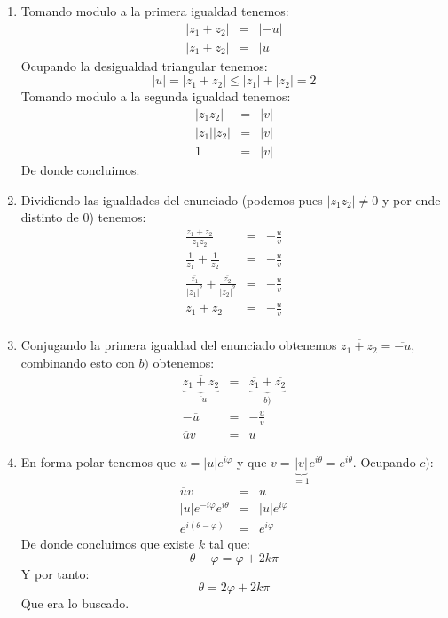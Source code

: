 \documentclass[letterpaper,11pt]{article}
\theoremstyle{plain}
\begin{document}
\begin{framed}
\begin{enumerate}[\it a)]
		\item Tomando modulo a la primera igualdad tenemos:
\begin{eqnarray*}
|z_1+z_2| & = & |-u| \\
|z_1+z_2| & = & |u|	
\end{eqnarray*}	
Ocupando la desigualdad triangular tenemos:
$$
|u|=|z_1+z_2| \leq |z_1|+|z_2| = 2 
$$
Tomando modulo a la segunda igualdad tenemos:
\begin{eqnarray*}
	|z_1z_2| & = & |v| \\
	|z_1||z_2|  & = & |v| \\
	1 & = & |v|
\end{eqnarray*}
De donde concluimos.
	\item Dividiendo las igualdades del enunciado (podemos pues $|z_1z_2| \neq 0 $ y por ende distinto de 0) tenemos:
	\begin{eqnarray*}
	 \frac{z_1+z_2}{z_1z_2} & = & -\frac{u}{v} \\
  \frac{1}{z_1}+ \frac{1}{z_2} & = & -\frac{u}{v} \\ 
  \frac{\overline{z_1}}{|z_1|^2} +   \frac{\overline{z_2}}{|z_2|^2}  & = & -\frac{u}{v} \\
\overline{z_1}+\overline{z_2} & = &  -\frac{u}{v}\\
	\end{eqnarray*}
	
		\item Conjugando la primera igualdad del enunciado obtenemos $\overline{z_1+z_2 }= \overline{-u}$, combinando esto con $b)$ obtenemos:
		\begin{eqnarray*}
		\underbrace{\overline{z_1+z_2 }}_{\overline{-u}}	& = & \underbrace{\overline{z_1}+ \overline{z_2}}_{b)} \\
		-\overline{u }& = & -\frac{u}{v}  \\
	 \overline{u}v	& = & u
		\end{eqnarray*}
		\item En forma polar tenemos que $u=|u|e^{i\varphi}$ y que $v=\underbrace{|v|}_{=1}e^{i \theta}= e^{i \theta} $. Ocupando $c)$:
		\begin{eqnarray*}
		\overline{u}v	& = & u \\
		|u|e^{-i\varphi} e^{i \theta} & = & |u|e^{i\varphi} \\
	e^{i(\theta - \varphi)}	& = &  e^{i\varphi}
		\end{eqnarray*}
		De donde concluimos que existe $k$ tal que:
		$$
		\theta - \varphi = \varphi + 2k\pi 
		$$
		Y por tanto:
		$$
		\theta = 2\varphi + 2k \pi
		$$
		Que era lo buscado.
	\end{enumerate}
	\end{framed}
	
\end{document}
